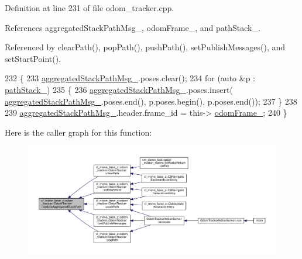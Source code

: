 Definition at line 231 of file odom\+\_\+tracker.\+cpp.



References aggregated\+Stack\+Path\+Msg\+\_\+, odom\+Frame\+\_\+, and path\+Stack\+\_\+.



Referenced by clear\+Path(), pop\+Path(), push\+Path(), set\+Publish\+Messages(), and set\+Start\+Point().


\begin{DoxyCode}
232 \{
233     \hyperlink{classcl__move__base__z_1_1odom__tracker_1_1OdomTracker_a0fb60113ace2791a1f1bbeed59946404}{aggregatedStackPathMsg\_}.poses.clear();
234     \textcolor{keywordflow}{for} (\textcolor{keyword}{auto} &p : \hyperlink{classcl__move__base__z_1_1odom__tracker_1_1OdomTracker_a1ccad1b568b6c65da43ba6639b6bd1ef}{pathStack\_})
235     \{
236         \hyperlink{classcl__move__base__z_1_1odom__tracker_1_1OdomTracker_a0fb60113ace2791a1f1bbeed59946404}{aggregatedStackPathMsg\_}.poses.insert(
      \hyperlink{classcl__move__base__z_1_1odom__tracker_1_1OdomTracker_a0fb60113ace2791a1f1bbeed59946404}{aggregatedStackPathMsg\_}.poses.end(), p.poses.begin(), p.poses.end());
237     \}
238 
239     \hyperlink{classcl__move__base__z_1_1odom__tracker_1_1OdomTracker_a0fb60113ace2791a1f1bbeed59946404}{aggregatedStackPathMsg\_}.header.frame\_id = this->
      \hyperlink{classcl__move__base__z_1_1odom__tracker_1_1OdomTracker_a54f31af5e74006560d94f266297853d4}{odomFrame\_};
240 \}
\end{DoxyCode}
Here is the caller graph for this function\+:
\nopagebreak
\begin{figure}[H]
\begin{center}
\leavevmode
\includegraphics[width=350pt]{classcl__move__base__z_1_1odom__tracker_1_1OdomTracker_a7922f1e1e688a2ed62d32d9914985a9f_icgraph}
\end{center}
\end{figure}
\mbox{\label{classcl__move__base__z_1_1odom__tracker_1_1OdomTracker_abe7ba4dbf014e1f2c64b5806ce42c073}} 
